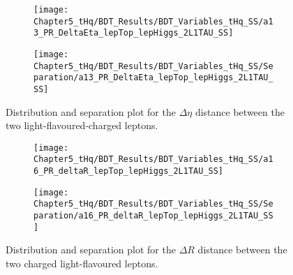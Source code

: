 \begin{figure}[h]
\centering
\begin{subfigure}{.45\textwidth}
  \centering
  \texttt{[image: Chapter5\_tHq/BDT\_Results/BDT\_Variables\_tHq\_SS/a13\_PR\_DeltaEta\_lepTop\_lepHiggs\_2L1TAU\_SS]}
\end{subfigure}%
\begin{subfigure}{.55\textwidth}
  \centering
  \texttt{[image: Chapter5\_tHq/BDT\_Results/BDT\_Variables\_tHq\_SS/Separation/a13\_PR\_DeltaEta\_lepTop\_lepHiggs\_2L1TAU\_SS]}
\end{subfigure}
\caption{Distribution and separation plot for the $\Delta \eta$ distance between the two light-flavoured-charged leptons.}
\label{fig:Appendix:BDTVARS:tHqSS:a13_PR_DeltaEta_lepTop_lepHiggs}
\end{figure}


\begin{figure}[h]
\centering
\begin{subfigure}{.45\textwidth}
  \centering
  \texttt{[image: Chapter5\_tHq/BDT\_Results/BDT\_Variables\_tHq\_SS/a16\_PR\_deltaR\_lepTop\_lepHiggs\_2L1TAU\_SS]}
\end{subfigure}%
\begin{subfigure}{.55\textwidth}
  \centering
  \texttt{[image: Chapter5\_tHq/BDT\_Results/BDT\_Variables\_tHq\_SS/Separation/a16\_PR\_deltaR\_lepTop\_lepHiggs\_2L1TAU\_SS]}
\end{subfigure}
\caption{Distribution and separation plot for the $\Delta R$ distance between the two charged light-flavoured leptons.}
\label{fig:Appendix:BDTVARS:tHqSS:a16_PR_deltaR_lepTop_lepHiggs}
\end{figure}





